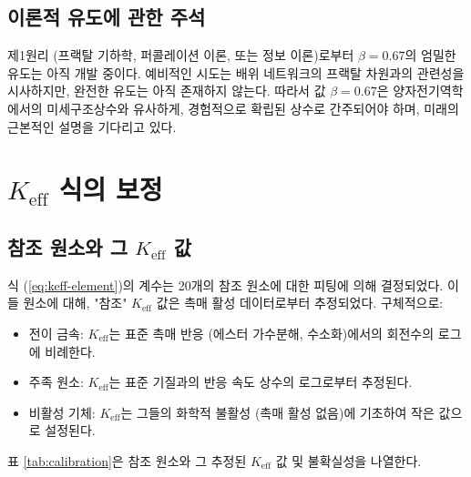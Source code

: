 \documentclass[12pt,a4paper]{article}
\newcommand{\Keff}{K_{\mathrm{eff}}}
\begin{document}
	\subsection{이론적 유도에 관한 주석}
	
	제1원리 (프랙탈 기하학, 퍼콜레이션 이론, 또는 정보 이론)로부터 $\beta = 0.67$의 엄밀한 유도는 아직 개발 중이다. 예비적인 시도는 배위 네트워크의 프랙탈 차원과의 관련성을 시사하지만, 완전한 유도는 아직 존재하지 않는다. 따라서 값 $\beta = 0.67$은 양자전기역학에서의 미세구조상수와 유사하게, 경험적으로 확립된 상수로 간주되어야 하며, 미래의 근본적인 설명을 기다리고 있다.
	
	\section{$\Keff$ 식의 보정}
	\label{sec:calibration}
	
	\subsection{참조 원소와 그 $\Keff$ 값}
	
	식 (\ref{eq:keff-element})의 계수는 20개의 참조 원소에 대한 피팅에 의해 결정되었다. 이들 원소에 대해, "참조" $\Keff$ 값은 촉매 활성 데이터로부터 추정되었다. 구체적으로:
	
	\begin{itemize}
		\item 전이 금속: $\Keff$는 표준 촉매 반응 (에스터 가수분해, 수소화)에서의 회전수의 로그에 비례한다.
		\item 주족 원소: $\Keff$는 표준 기질과의 반응 속도 상수의 로그로부터 추정된다.
		\item 비활성 기체: $\Keff$는 그들의 화학적 불활성 (촉매 활성 없음)에 기초하여 작은 값으로 설정된다.
	\end{itemize}
	
	표 \ref{tab:calibration}은 참조 원소와 그 추정된 $\Keff$ 값 및 불확실성을 나열한다.
	
\end{document}
